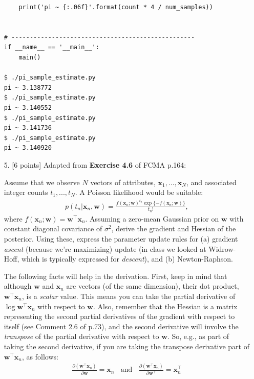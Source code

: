 \documentclass[10pt]{article}
\begin{document}
\begin{itemize}
\begin{verbatim}
    print('pi ~ {:.06f}'.format(count * 4 / num_samples))


# --------------------------------------------------
if __name__ == '__main__':
    main()
    
$ ./pi_sample_estimate.py
pi ~ 3.138772
$ ./pi_sample_estimate.py
pi ~ 3.140552
$ ./pi_sample_estimate.py
pi ~ 3.141736
$ ./pi_sample_estimate.py
pi ~ 3.140920
\end{verbatim}


\item[5.]  [6 points]
Adapted from {\bf Exercise 4.6} of FCMA p.164:

Assume that we observe $N$ vectors of attributes, $\mathbf{x}_1, ..., \mathbf{x}_N$, and associated integer counts $t_1, ..., t_N$.  A Poisson likelihood would be suitable:
\begin{eqnarray*}
p(t_n | \mathbf{x}_n, \mathbf{w}) = \frac{f(\mathbf{x}_n; \mathbf{w})^{t_n} \exp \{ -f(\mathbf{x}_n; \mathbf{w}) \}}{t_n!},
\end{eqnarray*}
where $f(\mathbf{x}_n;\mathbf{w}) = \mathbf{w}^\top\mathbf{x}_n$.
Assuming a zero-mean Gaussian prior on $\mathbf{w}$ with constant diagonal covariance of $\sigma^2$, derive the gradient and Hessian of the posterior.  Using these, express the parameter update rules for (a) gradient {\em ascent} (because we're maximizing) update (in class we looked at Widrow-Hoff, which is typically expressed for {\em descent}), and (b) Newton-Raphson.

The following facts will help in the derivation.  First, keep in mind that although $\mathbf{w}$ and $\mathbf{x}_n$ are vectors (of the same dimension), their dot product, $\mathbf{w}^\top\mathbf{x}_n$, is a {\em scalar} value.  This means you can take the partial derivative of $\log \mathbf{w}^\top\mathbf{x}_n$ with respect to $\mathbf{w}$.  Also, remember that the Hessian is a matrix representing the second partial derivatives of the gradient with respect to itself (see Comment 2.6 of p.73), and the second derivative will involve the {\em transpose} of the partial derivative with respect to $\mathbf{w}$.  So, e.g., as part of taking the second derivative, if you are taking the transpose derivative part of $\mathbf{w}^\top\mathbf{x}_n$, as follows:
\begin{eqnarray*}
\frac{\partial (\mathbf{w}^\top \mathbf{x}_n)}{\partial \mathbf{w}} = \mathbf{x}_n
~~~~\mathrm{and}~~~~
\frac{\partial (\mathbf{w}^\top \mathbf{x}_n)}{\partial \mathbf{w}^\top} = \mathbf{x}_n^\top
\end{eqnarray*}


\end{itemize}
\end{document}
